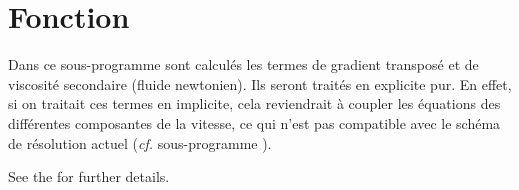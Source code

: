 
%
%
%
%


%

\hypertarget{visecv}{}

\vspace{1cm}
\section*{Fonction}
Dans ce sous-programme sont calcul\'es les termes de gradient transposé et de viscosité
secondaire (fluide newtonien). Ils seront traités en explicite
pur. En effet, si on traitait ces termes en implicite, cela reviendrait
à coupler les équations des différentes composantes de la vitesse, ce qui n'est
pas compatible avec le sch\'ema de r\'esolution actuel ({\it cf. } sous-programme ).

See the  for further details.

